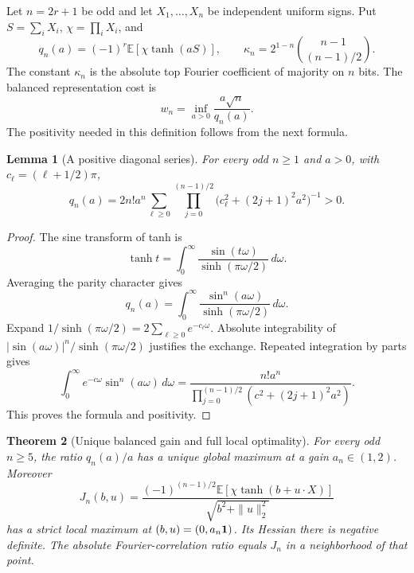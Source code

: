 \documentclass[11pt]{article}
\newtheorem{theorem}{Theorem}
\newtheorem{lemma}[theorem]{Lemma}
\theoremstyle{remark}\newtheorem{remark}[theorem]{Remark}
\newcommand{\E}{\mathbb E}\newcommand{\R}{\mathbb R}
\begin{document}
Let $n=2r+1$ be odd and let $X_1,\ldots,X_n$ be independent uniform signs.
Put $S=\sum_iX_i$, $\chi=\prod_iX_i$, and
\[
 q_n(a)=(-1)^r\E[\chi\tanh(aS)],\qquad
 \kappa_n=2^{1-n}\binom{n-1}{(n-1)/2}.
\]
The constant $\kappa_n$ is the absolute top Fourier coefficient of
majority on $n$ bits. The balanced representation cost is
\begin{equation}\label{eq:balanced-cost}
 w_n=\inf_{a>0}\frac{a\sqrt n}{q_n(a)}.
\end{equation}
The positivity needed in this definition follows from the next formula.

\begin{lemma}[A positive diagonal series]\label{lem:positive-series}
For every odd $n\ge1$ and $a>0$, with $c_\ell=(\ell+1/2)\pi$,
\begin{equation}\label{eq:positive-series}
 q_n(a)=2n!a^n\sum_{\ell\ge0}
 \prod_{j=0}^{(n-1)/2}\bigl(c_\ell^2+(2j+1)^2a^2\bigr)^{-1}>0.
\end{equation}
\end{lemma}
\begin{proof}
The sine transform of tanh is
\[
 \tanh t=\int_0^\infty\frac{\sin(t\omega)}{\sinh(\pi\omega/2)}\,d\omega.
\]
Averaging the parity character gives
\[
 q_n(a)=\int_0^\infty
 \frac{\sin^n(a\omega)}{\sinh(\pi\omega/2)}\,d\omega.
\]
Expand $1/\sinh(\pi\omega/2)=2\sum_{\ell\ge0}e^{-c_\ell\omega}$.
Absolute integrability of $|\sin(a\omega)|^n/\sinh(\pi\omega/2)$
justifies the exchange. Repeated integration by parts gives
\[
 \int_0^\infty e^{-c\omega}\sin^n(a\omega)\,d\omega
 =\frac{n!a^n}{\prod_{j=0}^{(n-1)/2}(c^2+(2j+1)^2a^2)}.
\]
This proves the formula and positivity.
\end{proof}

\begin{theorem}[Unique balanced gain and full local optimality]
\label{thm:local}
For every odd $n\ge5$, the ratio $q_n(a)/a$ has a unique global maximum
at a gain $a_n\in(1,2)$. Moreover
\[
 J_n(b,u)=\frac{(-1)^{(n-1)/2}\E[\chi\tanh(b+u\cdot X)]}
                   {\sqrt{b^2+\|u\|_2^2}}
\]
has a strict local maximum at $(b,u)=(0,a_n\mathbf 1)$. Its Hessian there is
negative definite. The absolute Fourier-correlation ratio equals $J_n$
in a neighborhood of that point.
\end{theorem}
\end{document}
